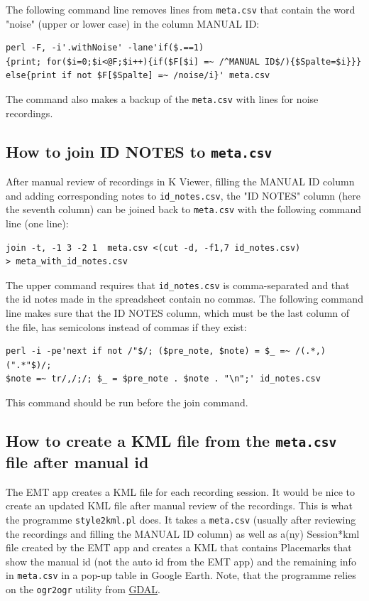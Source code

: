\documentclass[English, 11pt, twoside, authoryear]{article}
\begin{document}
The following command line removes lines from \texttt{meta.csv} that contain the word "noise" (upper or lower case) in the column MANUAL ID:

\begin{lstlisting}
perl -F, -i'.withNoise' -lane'if($.==1)
{print; for($i=0;$i<@F;$i++){if($F[$i] =~ /^MANUAL ID$/){$Spalte=$i}}}
else{print if not $F[$Spalte] =~ /noise/i}' meta.csv
\end{lstlisting}

The command also makes a backup of the \texttt{meta.csv} with lines for noise recordings.

%
%
\subsection{How to join ID NOTES to \texttt{meta.csv}}
%
%

After manual review of recordings in \textsf{K} Viewer, filling the MANUAL ID column and adding corresponding notes to \texttt{id\_notes.csv}, the "ID NOTES" column (here the seventh column) can be joined back to \texttt{meta.csv} with the following command line (one line):

\begin{lstlisting}
join -t, -1 3 -2 1  meta.csv <(cut -d, -f1,7 id_notes.csv) 
> meta_with_id_notes.csv
\end{lstlisting}

The upper command requires that \texttt{id\_notes.csv} is comma-separated and that the id notes made in the spreadsheet contain no commas. The following command line makes sure that the ID NOTES column, which must be the last column of the file, has semicolons instead of commas if they exist:

\begin{lstlisting}[numbers=none]
perl -i -pe'next if not /"$/; ($pre_note, $note) = $_ =~ /(.*,)(".*"$)/; 
$note =~ tr/,/;/; $_ = $pre_note . $note . "\n";' id_notes.csv
\end{lstlisting}

This command should be run before the \textsf{join} command.

%
%
\subsection{How to create a KML file from the \texttt{meta.csv} file after manual id}
%
%

The EMT app creates a KML file for each recording session. It would be nice to create an updated KML file after manual review of the recordings. This is what the programme \texttt{style2kml.pl} does. It takes a \texttt{meta.csv} (usually after reviewing the recordings and filling the MANUAL ID column) as well as a(ny) Session*kml file created by the EMT app and creates a KML that contains Placemarks that show the manual id (not the auto id from the EMT app) and the remaining info in \texttt{meta.csv} in a pop-up table in Google Earth. Note, that the programme relies on the \texttt{ogr2ogr} utility from \href{https://gdal.org/download.html}{GDAL}.
\end{document}
